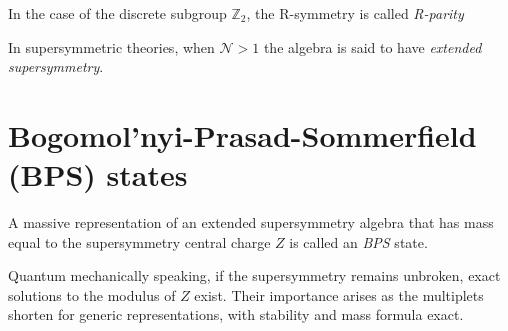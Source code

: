 \begin{remark}
In the case of the discrete subgroup $\mathbb{Z}_2$, the R-symmetry is called \textit{R-parity}
\end{remark}

\begin{definition}
In supersymmetric theories, when $\mathcal{N}>1$ the algebra is said to have
\textit{extended supersymmetry}.
\end{definition}

\section{Bogomol'nyi-Prasad-Sommerfield (BPS) states}
\begin{definition}
A massive representation of an extended supersymmetry algebra that has mass
equal to the supersymmetry central charge $Z$ is called an \textit{BPS} state.
\end{definition}

Quantum mechanically speaking, if the supersymmetry remains unbroken, exact
solutions to the modulus of $Z$ exist. Their importance arises as the
multiplets shorten for generic representations, with stability and mass formula
exact.

